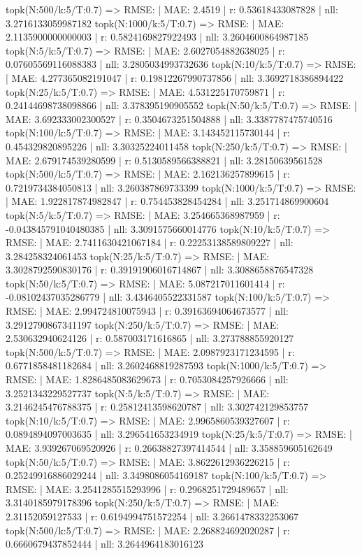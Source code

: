 topk(N:500/k:5/T:0.7) => RMSE: | MAE: 2.4519 | r: 0.53618433087828 | nll: 3.2716133059987182
topk(N:1000/k:5/T:0.7) => RMSE: | MAE: 2.1135900000000003 | r: 0.5824169827922493 | nll: 3.2604600864987185
topk(N:5/k:5/T:0.7) => RMSE: | MAE: 2.6027054882638025 | r: 0.07605569116088383 | nll: 3.2805034993732636
topk(N:10/k:5/T:0.7) => RMSE: | MAE: 4.277365082191047 | r: 0.19812267990737856 | nll: 3.3692718386894422
topk(N:25/k:5/T:0.7) => RMSE: | MAE: 4.531225170759871 | r: 0.24144698738098866 | nll: 3.378395190905552
topk(N:50/k:5/T:0.7) => RMSE: | MAE: 3.692333002300527 | r: 0.3504673251504888 | nll: 3.3387787475740516
topk(N:100/k:5/T:0.7) => RMSE: | MAE: 3.143452115730144 | r: 0.454329820895226 | nll: 3.30325224011458
topk(N:250/k:5/T:0.7) => RMSE: | MAE: 2.679174539280599 | r: 0.5130589566388821 | nll: 3.28150639561528
topk(N:500/k:5/T:0.7) => RMSE: | MAE: 2.162136257899615 | r: 0.7219734384050813 | nll: 3.260387869733399
topk(N:1000/k:5/T:0.7) => RMSE: | MAE: 1.922817874982847 | r: 0.754453828454284 | nll: 3.251714869900604
topk(N:5/k:5/T:0.7) => RMSE: | MAE: 3.254665368987959 | r: -0.043845791040480385 | nll: 3.3091575660014776
topk(N:10/k:5/T:0.7) => RMSE: | MAE: 2.7411630421067184 | r: 0.22253138589809227 | nll: 3.284258324061453
topk(N:25/k:5/T:0.7) => RMSE: | MAE: 3.3028792590830176 | r: 0.39191906016714867 | nll: 3.3088658876547328
topk(N:50/k:5/T:0.7) => RMSE: | MAE: 5.087217011601414 | r: -0.08102437035286779 | nll: 3.4346405522331587
topk(N:100/k:5/T:0.7) => RMSE: | MAE: 2.994724810075943 | r: 0.39163694064673577 | nll: 3.2912790867341197
topk(N:250/k:5/T:0.7) => RMSE: | MAE: 2.530632940624126 | r: 0.587003171616865 | nll: 3.273788855920127
topk(N:500/k:5/T:0.7) => RMSE: | MAE: 2.0987923171234595 | r: 0.6771858481182684 | nll: 3.2602468819287593
topk(N:1000/k:5/T:0.7) => RMSE: | MAE: 1.8286485083629673 | r: 0.7053084257926666 | nll: 3.2521343229527737
topk(N:5/k:5/T:0.7) => RMSE: | MAE: 3.2146245476788375 | r: 0.25812413598620787 | nll: 3.302742129853757
topk(N:10/k:5/T:0.7) => RMSE: | MAE: 2.9965860539327607 | r: 0.0894894097003635 | nll: 3.296541653234919
topk(N:25/k:5/T:0.7) => RMSE: | MAE: 3.939267069520926 | r: 0.26638827397414544 | nll: 3.358859605162649
topk(N:50/k:5/T:0.7) => RMSE: | MAE: 3.8622612936226215 | r: 0.25249916886029244 | nll: 3.3498086054169187
topk(N:100/k:5/T:0.7) => RMSE: | MAE: 3.2541285515293996 | r: 0.2968251729489657 | nll: 3.3140185979178396
topk(N:250/k:5/T:0.7) => RMSE: | MAE: 2.31152059127533 | r: 0.6194994751572254 | nll: 3.2661478332253067
topk(N:500/k:5/T:0.7) => RMSE: | MAE: 2.268824692020287 | r: 0.6660679437852444 | nll: 3.2644964183016123
